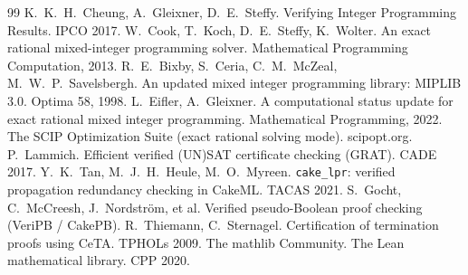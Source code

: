\documentclass[runningheads]{llncs}
\newcommand{\code}[1]{\texttt{#1}}
\begin{document}
\begin{thebibliography}{99}
 K.\ K.\ H.\ Cheung, A.\ Gleixner, D.\ E.\ Steffy.
  Verifying Integer Programming Results. IPCO 2017.
 W.\ Cook, T.\ Koch, D.\ E.\ Steffy, K.\ Wolter.
  An exact rational mixed-integer programming solver.
  Mathematical Programming Computation, 2013.
 R.\ E.\ Bixby, S.\ Ceria, C.\ M.\ McZeal, M.\ W.\ P.\ Savelsbergh.
  An updated mixed integer programming library: MIPLIB 3.0. Optima 58, 1998.
 L.\ Eifler, A.\ Gleixner.
  A computational status update for exact rational mixed integer programming.
  Mathematical Programming, 2022.
 The SCIP Optimization Suite (exact rational solving mode). scipopt.org.
 P.\ Lammich. Efficient verified (UN)SAT certificate checking (GRAT). CADE 2017.
 Y.\ K.\ Tan, M.\ J.\ H.\ Heule, M.\ O.\ Myreen. \code{cake\_lpr}: verified
  propagation redundancy checking in CakeML. TACAS 2021.
 S.\ Gocht, C.\ McCreesh, J.\ Nordstr\"om, et al. Verified pseudo-Boolean
  proof checking (VeriPB / CakePB).
 R.\ Thiemann, C.\ Sternagel. Certification of termination proofs using CeTA. TPHOLs 2009.
 The mathlib Community. The Lean mathematical library. CPP 2020.
\end{thebibliography}
\end{document}

